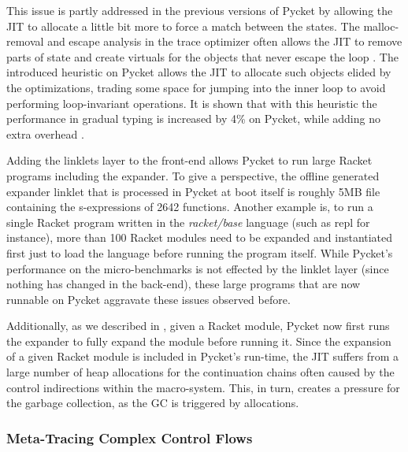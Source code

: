 This issue is partly addressed in the previous versions of Pycket by
allowing the JIT to allocate a little bit more to force a match
between the states. The malloc-removal and escape analysis in the
trace optimizer often allows the JIT to remove parts of state and
create virtuals for the objects that never escape the loop
\cite{malloc-removal:11, loop-aware:12}. The introduced heuristic on
Pycket allows the JIT to allocate such objects elided by the
optimizations, trading some space for jumping into the inner loop to
avoid performing loop-invariant operations. It is shown that with this
heuristic the performance in gradual typing is increased by 4\% on
Pycket, while adding no extra overhead \cite{pycket17}.

Adding the linklets layer to the front-end allows Pycket to run large
Racket programs including the expander. To give a perspective, the
offline generated expander linklet that is processed in Pycket at boot
itself is roughly 5MB file containing the s-expressions of 2642
functions. Another example is, to run a single Racket program written
in the \emph{racket/base} language (such as repl for instance), more
than 100 Racket modules need to be expanded and instantiated first
just to load the language before running the program itself. While
Pycket's performance on the micro-benchmarks is not effected by the
linklet layer (since nothing has changed in the back-end), these large
programs that are now runnable on Pycket aggravate these issues
observed before.

Additionally, as we described in , given a
Racket module, Pycket now first runs the expander to fully expand the
module before running it. Since the expansion of a given Racket module
is included in Pycket's run-time, the JIT suffers from a large number
of heap allocations for the continuation chains often caused by the
control indirections within the macro-system. This, in turn, creates a
pressure for the garbage collection, as the GC is triggered by
allocations.

\subsubsection{Meta-Tracing Complex Control Flows}


